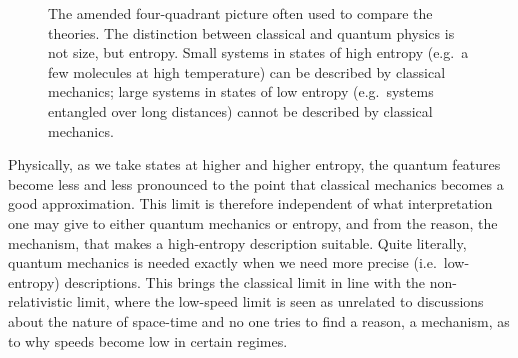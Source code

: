 \documentclass{SciPost}
\begin{document}
\begin{figure}[h]
	\centering
	\caption {The amended four-quadrant picture often used to compare the theories. The distinction between classical and quantum physics is not size, but entropy. Small systems in states of high entropy (e.g.~a few molecules at high temperature) can be described by classical mechanics; large systems in states of low entropy (e.g.~systems entangled over long distances) cannot be described by classical mechanics. } \label{fig_quadrants}
\end{figure}

Physically, as we take states at higher and higher entropy, the quantum features become less and less pronounced to the point that classical mechanics becomes a good approximation. This limit is therefore independent of what interpretation one may give to either quantum mechanics or entropy, and from the reason, the mechanism, that makes a high-entropy description suitable. Quite literally, quantum mechanics is needed exactly when we need more precise (i.e.~low-entropy) descriptions. This brings the classical limit in line with the non-relativistic limit, where the low-speed limit is seen as unrelated to discussions about the nature of space-time and no one tries to find a reason, a mechanism, as to why speeds become low in certain regimes.
\end{document}
